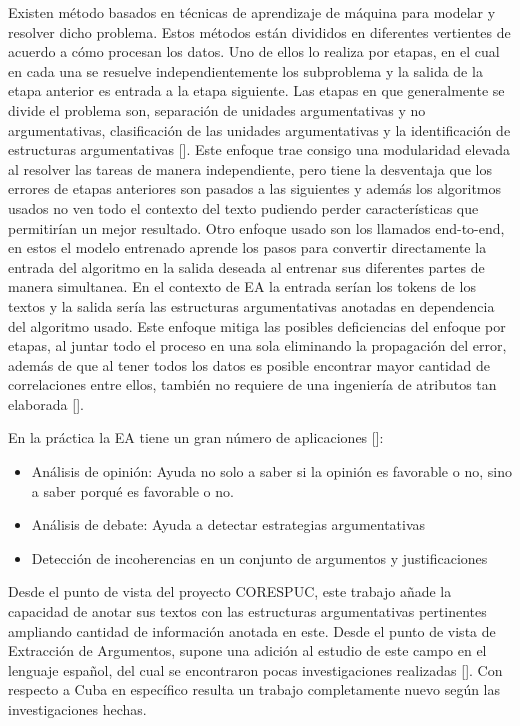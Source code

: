 Existen método basados en técnicas de aprendizaje de máquina para modelar y resolver dicho problema.
Estos métodos están divididos en diferentes vertientes de acuerdo a cómo procesan los datos. Uno de ellos lo realiza por
etapas, en el cual en cada una se resuelve independientemente los subproblema y la salida de la etapa 
anterior es entrada a la etapa siguiente. Las etapas en que generalmente se divide el problema
son, separación de unidades argumentativas y no argumentativas, clasificación de las unidades 
argumentativas y la identificación de estructuras argumentativas [\cite{stab2014identifying}].
Este enfoque trae consigo una modularidad elevada al resolver las tareas de manera independiente, pero
tiene la desventaja que los errores de etapas anteriores son pasados a las siguientes y además los algoritmos
usados no ven todo el contexto del texto pudiendo perder características que permitirían un mejor resultado.
Otro enfoque usado son los llamados end-to-end, en estos el modelo entrenado aprende los pasos para convertir
directamente la entrada del algoritmo en la salida deseada al entrenar sus diferentes partes de manera 
simultanea. En el contexto de EA la entrada serían los tokens de los textos y la salida sería las
estructuras argumentativas anotadas en dependencia del algoritmo usado. Este enfoque mitiga las posibles
deficiencias del enfoque por etapas, al juntar todo el proceso en una sola eliminando la propagación
del error, además de que al tener todos los datos es posible encontrar mayor cantidad de correlaciones 
entre ellos, también no requiere de una ingeniería de atributos tan elaborada [\cite{eger2017neural}].

En la práctica la EA tiene un gran número de aplicaciones [\cite{janier2019argument}]: 
\begin{itemize}
    \item Análisis de opinión: Ayuda no solo a saber si la opinión es favorable o no, sino a saber
    porqué es favorable o no.
    \item Análisis de debate: Ayuda a detectar estrategias argumentativas
    \item Detección de incoherencias en un conjunto de argumentos y justificaciones
\end{itemize}


Desde el punto de vista del proyecto CORESPUC, este trabajo añade la capacidad de anotar
sus textos con las estructuras argumentativas pertinentes ampliando cantidad de
información anotada en este. Desde el punto de vista de Extracción de Argumentos, supone una
adición al estudio de este campo en el lenguaje español, del cual se encontraron pocas
investigaciones realizadas [\cite{esteve2020mineria}]. Con respecto a Cuba en específico
resulta un trabajo completamente nuevo según las investigaciones hechas.

